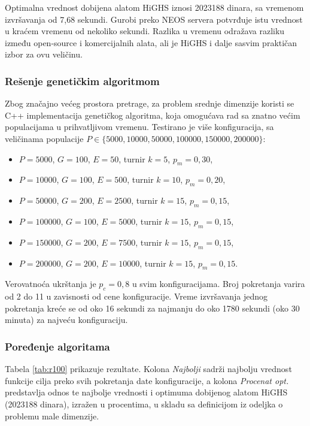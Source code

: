 \documentclass[12pt]{article}
\begin{document}
Optimalna vrednost dobijena alatom HiGHS iznosi 2023188 dinara, sa vremenom izvršavanja od 7,68 sekundi. Gurobi preko NEOS servera potvrđuje istu vrednost u kraćem vremenu od nekoliko sekundi. Razlika u vremenu odražava razliku između open-source i komercijalnih alata, ali je HiGHS i dalje sasvim praktičan izbor za ovu veličinu.

\subsubsection{Rešenje genetičkim algoritmom}

Zbog značajno većeg prostora pretrage, za problem srednje dimenzije koristi se C++ implementacija genetičkog algoritma, koja omogućava rad sa znatno većim populacijama u prihvatljivom vremenu. Testirano je više konfiguracija, sa veličinama populacije $P \in \{5000, 10000, 50000, 100000, 150000, 200000\}$:
\begin{itemize}
    \item $P = 5000$, $G = 100$, $E = 50$, turnir $k = 5$, $p_m = 0{,}30$,
    \item $P = 10000$, $G = 100$, $E = 500$, turnir $k = 10$, $p_m = 0{,}20$,
    \item $P = 50000$, $G = 200$, $E = 2500$, turnir $k = 15$, $p_m = 0{,}15$,
    \item $P = 100000$, $G = 100$, $E = 5000$, turnir $k = 15$, $p_m = 0{,}15$,
    \item $P = 150000$, $G = 200$, $E = 7500$, turnir $k = 15$, $p_m = 0{,}15$,
    \item $P = 200000$, $G = 200$, $E = 10000$, turnir $k = 15$, $p_m = 0{,}15$.
\end{itemize}
Verovatnoća ukrštanja je $p_c = 0{,}8$ u svim konfiguracijama. Broj pokretanja varira od 2 do 11 u zavisnosti od cene konfiguracije. Vreme izvršavanja jednog pokretanja kreće se od oko 16 sekundi za najmanju do oko 1780 sekundi (oko 30 minuta) za najveću konfiguraciju.

\subsubsection{Poređenje algoritama}

Tabela \ref{tab:r100} prikazuje rezultate. Kolona \textit{Najbolji} sadrži najbolju vrednost funkcije cilja preko svih pokretanja date konfiguracije, a kolona \textit{Procenat opt.} predstavlja odnos te najbolje vrednosti i optimuma dobijenog alatom HiGHS (2023188 dinara), izražen u procentima, u skladu sa definicijom iz odeljka o problemu male dimenzije.
\end{document}
